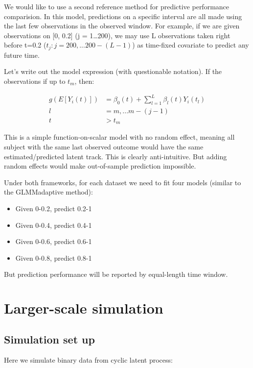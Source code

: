 \documentclass[
]{article}
\providecommand{\tightlist}{%
  \setlength{\itemsep}{0pt}\setlength{\parskip}{0pt}}
\begin{document}
We would like to use a second reference method for predictive
performance comparision. In this model, predictions on a specific
interval are all made using the last few observations in the observed
window. For example, if we are given observations on {[}0, 0.2{]} (j =
1\ldots200), we may use L observations taken right before t=0.2
(\(t_j: j=200, ... 200-(L-1)\)) as time-fixed covariate to predict any
future time.

Let's write out the model expression (with questionable notation). If
the observations if up to \(t_m\), then:

\[\begin{aligned}
g(E[Y_i(t)]) &= \beta_0(t) +\sum_{l=1}^L \beta_l (t)Y_i(t_l)\\
l & = m,...m-(j-1)\\
t &> t_m 
\end{aligned}\]

This is a simple function-on-scalar model with no random effect, meaning
all subject with the same last observed outcome would have the same
estimated/predicted latent track. This is clearly anti-intuitive. But
adding random effects would make out-of-sample prediction impossible.

Under both frameworks, for each dataset we need to fit four models
(similar to the GLMMadaptive method):

\begin{itemize}
\tightlist
\item
  Given 0-0.2, predict 0.2-1
\item
  Given 0-0.4, predict 0.4-1
\item
  Given 0-0.6, predict 0.6-1
\item
  Given 0-0.8, predict 0.8-1
\end{itemize}

But prediction performance will be reported by equal-length time window.

\hypertarget{larger-scale-simulation}{%
\section{Larger-scale simulation}\label{larger-scale-simulation}}

\hypertarget{simulation-set-up}{%
\subsection{Simulation set up}\label{simulation-set-up}}

Here we simulate binary data from cyclic latent process:
\end{document}
